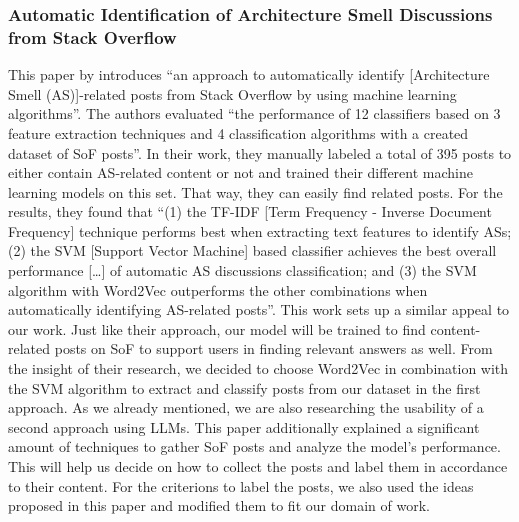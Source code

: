 \documentclass[english,bachelor]{swsLeipzig}
\begin{document}
\subsubsection{Automatic Identification of Architecture Smell Discussions from Stack Overflow}
This paper by \citet{tian:2020} introduces ``an approach to automatically identify [Architecture Smell (AS)]-related posts from Stack Overflow by using machine learning algorithms''. The authors evaluated ``the performance of 12 classifiers based on 3 feature extraction techniques and 4 classification algorithms with a created dataset of SoF posts''. In their work, they manually labeled a total of 395 posts to either contain AS-related content or not and trained their different machine learning models on this set. That way, they can easily find related posts. For the results, they found that ``(1) the TF-IDF [Term Frequency - Inverse Document Frequency] technique performs best when extracting text features to identify ASs; (2) the SVM [Support Vector Machine] based classifier achieves the best overall performance [\ldots] of automatic AS discussions classification; and (3) the SVM algorithm with Word2Vec outperforms the other combinations when automatically identifying AS-related posts''. This work sets up a similar appeal to our work. Just like their approach, our model will be trained to find content-related posts on SoF to support users in finding relevant answers as well. From the insight of their research, we decided to choose Word2Vec in combination with the SVM algorithm to extract and classify posts from our dataset in the first approach. As we already mentioned, we are also researching the usability of a second approach using LLMs. This paper additionally explained a significant amount of techniques to gather SoF posts and analyze the model's performance. This will help us decide on how to collect the posts and label them in accordance to their content. For the criterions to label the posts, we also used the ideas proposed in this paper and modified them to fit our domain of work.
\end{document}
